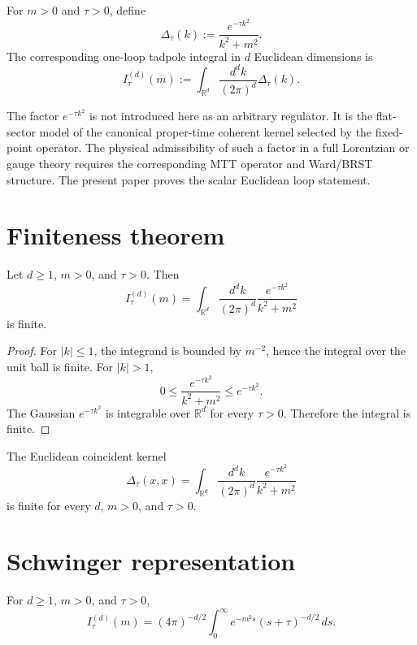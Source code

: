 \documentclass[11pt]{article}
\begin{document}
\begin{definition}
For \(m>0\) and \(\tau>0\), define
\[
\Delta_\tau(k):=\frac{e^{-\tau k^2}}{k^2+m^2}.
\]
The corresponding one-loop tadpole integral in \(d\) Euclidean dimensions is
\[
I_\tau^{(d)}(m):=\int_{\mathbb R^d}\frac{d^d k}{(2\pi)^d}\Delta_\tau(k).
\]
\end{definition}

\begin{remark}
The factor \(e^{-\tau k^2}\) is not introduced here as an arbitrary regulator. It is the flat-sector model of the canonical proper-time coherent kernel selected by the fixed-point operator. The physical admissibility of such a factor in a full Lorentzian or gauge theory requires the corresponding MTT operator and Ward/BRST structure. The present paper proves the scalar Euclidean loop statement.
\end{remark}

\section{Finiteness theorem}

\begin{theorem}
Let \(d\ge1\), \(m>0\), and \(\tau>0\). Then
\[
I_\tau^{(d)}(m)
=
\int_{\mathbb R^d}\frac{d^d k}{(2\pi)^d}
\frac{e^{-\tau k^2}}{k^2+m^2}
\]
is finite.
\end{theorem}

\begin{proof}
For \(|k|\le1\), the integrand is bounded by \(m^{-2}\), hence the integral over the unit ball is finite. For \(|k|>1\),
\[
0\le \frac{e^{-\tau k^2}}{k^2+m^2}\le e^{-\tau k^2}.
\]
The Gaussian \(e^{-\tau k^2}\) is integrable over \(\mathbb R^d\) for every \(\tau>0\). Therefore the integral is finite.
\end{proof}

\begin{corollary}
The Euclidean coincident kernel
\[
\Delta_\tau(x,x)
=
\int_{\mathbb R^d}\frac{d^d k}{(2\pi)^d}
\frac{e^{-\tau k^2}}{k^2+m^2}
\]
is finite for every \(d\), \(m>0\), and \(\tau>0\).
\end{corollary}

\section{Schwinger representation}

\begin{theorem}
For \(d\ge1\), \(m>0\), and \(\tau>0\),
\[
I_\tau^{(d)}(m)
=
(4\pi)^{-d/2}
\int_0^\infty e^{-m^2s}(s+\tau)^{-d/2}\,ds.
\]
\end{theorem}
\end{document}
